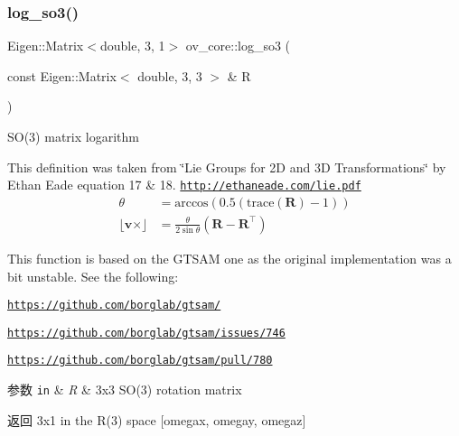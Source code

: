 \subsubsection{\texorpdfstring{log\+\_\+so3()}{log\_so3()}}
{\footnotesize\ttfamily Eigen\+::\+Matrix$<$double, 3, 1$>$ ov\+\_\+core\+::log\+\_\+so3 (\begin{DoxyParamCaption}\item[{const Eigen\+::\+Matrix$<$ double, 3, 3 $>$ \&}]{R }\end{DoxyParamCaption})\hspace{0.3cm}{\ttfamily [inline]}}



S\+O(3) matrix logarithm 

This definition was taken from \char`\"{}\+Lie Groups for 2\+D and 3\+D Transformations\char`\"{} by Ethan Eade equation 17 \& 18. \href{http://ethaneade.com/lie.pdf}{\tt http\+://ethaneade.\+com/lie.\+pdf} \begin{align*} \theta &= \textrm{arccos}(0.5(\textrm{trace}(\mathbf{R})-1)) \\ \lfloor\mathbf{v}\times\rfloor &= \frac{\theta}{2\sin{\theta}}(\mathbf{R}-\mathbf{R}^\top) \end{align*}

This function is based on the G\+T\+S\+AM one as the original implementation was a bit unstable. See the following\+:
\begin{DoxyItemize}
\item \href{https://github.com/borglab/gtsam/}{\tt https\+://github.\+com/borglab/gtsam/}
\item \href{https://github.com/borglab/gtsam/issues/746}{\tt https\+://github.\+com/borglab/gtsam/issues/746}
\item \href{https://github.com/borglab/gtsam/pull/780}{\tt https\+://github.\+com/borglab/gtsam/pull/780}
\end{DoxyItemize}


\begin{DoxyParams}[1]{参数}
\mbox{\tt in}  & {\em R} & 3x3 S\+O(3) rotation matrix \\
\hline
\end{DoxyParams}
\begin{DoxyReturn}{返回}
3x1 in the R(3) space \mbox{[}omegax, omegay, omegaz\mbox{]} 
\end{DoxyReturn}
\mbox{\label{namespaceov__core_a03115c09fd2fa8a6af23830b9230a683}} 
